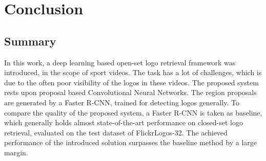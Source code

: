 \chapter{Conclusion}

\section{Summary}
In this work, a deep learning based open-set logo retrieval framework was introduced, in the scope of sport videos. The task has a lot of challenges, which is due to the often poor visibility of the logos in these videos. The proposed system rests upon proposal based Convolutional Neural Networks. The region proposals are generated by a Faster R-CNN, trained for detecting logos generally. To compare the quality of the proposed system,  a Faster R-CNN is taken as baseline, which generally holds almost state-of-the-art performance on closed-set logo retrieval, evaluated on the test dataset of FlickrLogos-32. The achieved performance of the introduced solution surpasses the baseline method by a large margin.
